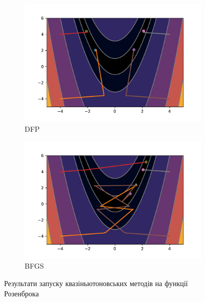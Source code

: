 \begin{figure}[h!]
\begin{subfigure}{0.5\textwidth}
        \includegraphics[width=\textwidth, trim=1.4cm 0.5cm 1.3cm 1cm, clip]{assets/DFP/rosenbrock.pdf}
        \caption{DFP}
    \end{subfigure}
    \begin{subfigure}{0.5\textwidth}
        \includegraphics[width=\textwidth, trim=1.4cm 0.5cm 1.3cm 1cm, clip]{assets/BFGS/rosenbrock.pdf}
        \caption{BFGS}
    \end{subfigure}
    \caption{Результати запуску квазіньютоновських методів на функції Розенброка}
\end{figure}

